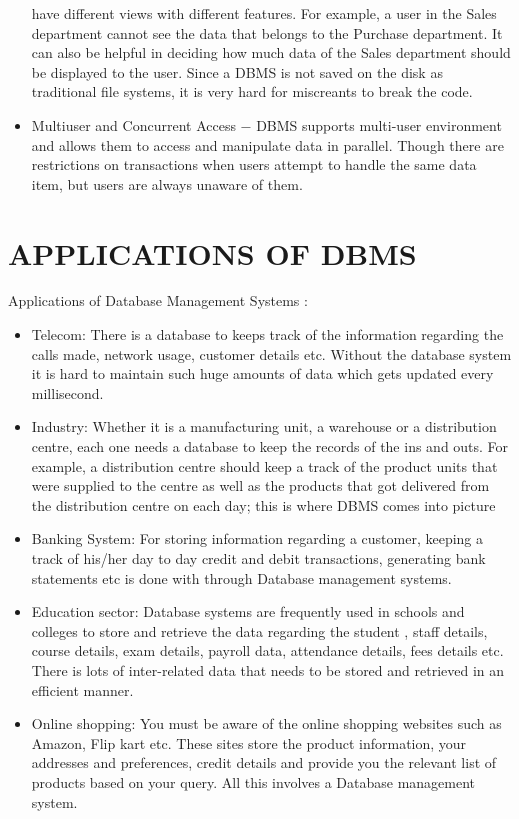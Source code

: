 \begin{itemize}
{have different views with different features. For example, a user in the Sales department
cannot see the data that belongs to the Purchase department. It can also be helpful in
deciding how much data of the Sales department should be displayed to the user. Since a
DBMS is not saved on the disk as traditional file systems, it is very hard for miscreants to
break the code.}
\item{Multiuser and Concurrent Access − DBMS supports multi-user environment and allows
them to access and manipulate data in parallel. Though there are restrictions on transactions
when users attempt to handle the same data item, but users are always unaware of them.
}
\end{itemize} 
\par 
\par
\section{APPLICATIONS OF DBMS}
Applications of Database Management Systems :
\begin{itemize}
\item {Telecom: There is a database to keeps track of the information regarding the calls made,
network usage, customer details etc. Without the database system it is hard to maintain such
huge amounts of data which gets updated every millisecond.}
\item{Industry: Whether it is a manufacturing unit, a warehouse or a distribution centre, each one
needs a database to keep the records of the ins and outs. For example, a distribution centre
should keep a track of the product units that were supplied to the centre as well as the
products that got delivered from the distribution centre on each day; this is where DBMS
comes into picture}
\item {Banking System: For storing information regarding a customer, keeping a track of his/her
day to day credit and debit transactions, generating bank statements etc is done with through
Database management systems.}
\item {Education sector: Database systems are frequently used in schools and colleges to store and
retrieve the data regarding the student , staff details, course details, exam details, payroll
data, attendance details, fees details etc. There is lots of inter-related data that needs to be
stored and retrieved in an efficient manner.}
\item{Online shopping: You must be aware of the online shopping websites such as Amazon, Flip
kart etc. These sites store the product information, your addresses and preferences, credit
details and provide you the relevant list of products based on your query. All this involves a
Database management system.}
\end{itemize}
\par
